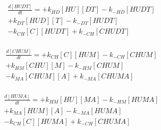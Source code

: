 \begin{equation}
\begin{split}
\frac{d[HUDT]}{dt} =  + k_{HD}[HU][DT]  - k_{-HD}[HUDT]   \\%
                      + k_{DT}[HUD][T]  - k_{-DT}[HUDT]   \\%
                      - k_{CH}[C][HUDT] + k_{-CH}[CHUDT]  \\%
\end{split}
\end{equation}

\begin{equation}
\begin{split}
\frac{d[CHUM]}{dt} =  + k_{CH}[C][HUM]  - k_{-CH}[CHUM]   \\%
                      + k_{HM}[CHU][M]  - k_{-HM}[CHUM]   \\%
                      - k_{MA}[CHUM][A] + k_{-MA}[CHUMA]  \\%
\end{split}
\end{equation}

\begin{equation}
\begin{split}
\frac{d[HUMA]}{dt} =  + k_{HM}[HU][MA]  - k_{-HM}[HUMA]   \\%
                      + k_{MA}[HUM][A]  - k_{-MA}[HUMA]   \\%
                      - k_{CH}[C][HUMA] + k_{-CH}[CHUMA]  \\%
\end{split}
\end{equation}


